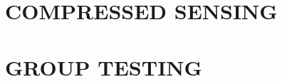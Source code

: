 \documentclass[12pt]{report}
\begin{document}
\chapter{COMPRESSED SENSING}
\label{chap:cs}


\chapter{GROUP TESTING}
\label{chap:gt}




\let\oldbibitem\bibitem
\renewcommand{\bibitem}{\setlength{\itemsep}{0pt}\oldbibitem}

{}
\renewcommand{\bibname}{{\normalsize\rm REFERENCES}}



%
\end{document}
